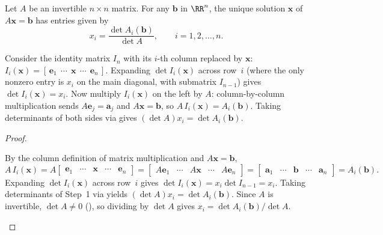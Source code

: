 \documentclass[10pt]{scrartcl}
\newcommand{\vv}[1]{\mathbf{#1}}
\begin{document}
\begin{theorem*}
  Let $A$ be an invertible $n\times n$ matrix. For any $\vv b$ in $\RR^n$, the unique solution $\vv x$ of $A\vv x=\vv b$ has entries given by
  \[
    x_i = \frac{\det A_i(\vv b)}{\det A}, \qquad i=1,2,\dots,n.
  \]
\end{theorem*}
\begin{ideabox}
  Consider the identity matrix $I_n$ with its $i$-th column replaced by $\vv x$: $I_i(\vv x)=[\,\vv e_1\ \ \cdots\ \ \vv x\ \ \cdots\ \ \vv e_n\,]$. Expanding $\det I_i(\vv x)$ across row~$i$ (where the only nonzero entry is $x_i$ on the main diagonal, with submatrix $I_{n-1}$) gives $\det I_i(\vv x)=x_i$. Now multiply $I_i(\vv x)$ on the left by $A$: column-by-column multiplication sends $A\vv e_j=\vv a_j$ and $A\vv x=\vv b$, so $A\,I_i(\vv x)=A_i(\vv b)$. Taking determinants of both sides via  gives $(\det A)x_i=\det A_i(\vv b)$.
\end{ideabox}
\begin{proof}
  \begin{steps}
    \ii By the column definition of matrix multiplication and $A\vv x=\vv b$,
    \[
      A\,I_i(\vv x) = A\begin{bmatrix} \vv e_1 & \cdots & \vv x & \cdots & \vv e_n \end{bmatrix} = \begin{bmatrix} A\vv e_1 & \cdots & A\vv x & \cdots & A\vv e_n \end{bmatrix} = \begin{bmatrix} \vv a_1 & \cdots & \vv b & \cdots & \vv a_n \end{bmatrix} = A_i(\vv b).
    \]
    \ii Expanding $\det I_i(\vv x)$ across row~$i$ gives $\det I_i(\vv x)=x_i\det I_{n-1}=x_i$.
    \ii Taking determinants of Step~1 via  yields $(\det A)x_i=\det A_i(\vv b)$. Since $A$ is invertible, $\det A\ne 0$ (), so dividing by $\det A$ gives $x_i=\det A_i(\vv b)/\det A$.
  \end{steps}
\end{proof}
\end{document}

